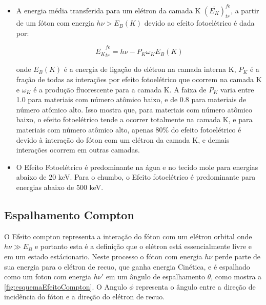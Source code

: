 \documentclass[11pt,a4paper]{article}
\begin{document}
    \begin{itemize}
		\item A energia média transferida para um elétron da camada K $(\bar{E_K})_{tr}^{fe}$, a partir de um fóton com energia $h \nu > E_B(K)$ devido ao efeito fotoelétrico é dada por:
		
			\begin{equation}
				\bar{E_K}_{tr}^{fe} = h\nu - P_K \omega_K E_B(K)
			\end{equation}

		\noindent onde $E_B(K)$ é a energia de ligação do elétron na camada interna K, $P_K$ é a fração de todas as interações por efeito fotoelétrico que ocorrem na camada K e $\omega_K$ é a produção fluorescente para a camada K. A faixa de $P_K$ varia entre 1.0 para materiais com número atômico baixo, e de 0.8 para materiais de número atômico alto. Isso mostra que, para materiais com número atômico baixo, o efeito fotoelétrico tende a ocorrer totalmente na camada K, e para materiais com número atômico alto, apenas 80\% do efeito fotoelétrico é devido à interação do fóton com um elétron da camada K, e demais interações ocorrem em outras camadas. 

		\item O Efeito Fotoelétrico é predominante na água e no tecido mole para energias abaixo de 20 keV. Para o chumbo, o Efeito fotoelétrico é predominante para energias abaixo de 500 keV.
	\end{itemize}        

\subsection*{Espalhamento Compton}

    O Efeito compton representa a interação do fóton com um elétron orbital onde  $h\nu \gg E_B $ e portanto esta é a definição que o elétron está essencialmente livre e em um estado estácionario. Neste processo o fóton com  energia $h\nu$ perde parte de sua energia para o elétron de recuo, que ganha energia Cinética, e é espalhado  como um  foton com energia $h\nu'$  em um ângulo de espalhamento $\theta$, como mostra a \ref{fig:esquemaEfeitoCompton}. O Angulo $\phi$ representa o ângulo entre a direção de incidência do fóton e a direção do elétron de recuo. 
\end{document}
